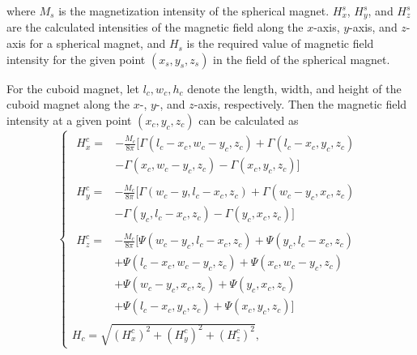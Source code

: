 \documentclass[journal]{IEEEtran}
\begin{document}
where $M_s$ is the magnetization intensity of the spherical magnet. 
$H_x^s$, $H_y^s$, and $H_z^s$ are the calculated intensities of the magnetic field along the $x$-axis, $y$-axis, and $z$-axis for a spherical magnet, and $H_s$ is the required value of magnetic field intensity for the given point $(x_s, y_s, z_s)$ in the field of the spherical magnet.



For the cuboid magnet, let $l_c, w_c, h_c$ denote the length, width, and height of the cuboid magnet along the $x$-, $y$-, and $z$-axis, respectively. Then the magnetic field intensity at a given point $(x_c, y_c, z_c)$ can be calculated as
\begin{equation}
\label{mag-cuboid}
    \left\{\begin{array}{lr}
    \begin{aligned}
    H_{x}^{c} = &-\frac{M_c}{8\pi}[\Gamma(l_c - x_c, w_c - y_c, z_c)+\Gamma(l_c - x_c, y_c, z_c) \\
       &-\Gamma(x_c, w_c - y_c, z_c)-\Gamma(x_c, y_c, z_c)]
    \end{aligned}
    \\
    \begin{aligned}
    H_{y}^{c} = &-\frac{M_c}{8\pi}[\Gamma(w_c - y, l_c - x_c, z_c)+\Gamma(w_c - y_c, x_c, z_c) \\            &-\Gamma(y_c, l_c - x_c, z_c)-\Gamma(y_c, x_c, z_c)]
    \end{aligned}
    \\
    \begin{aligned}
    H_{z}^{c} = &-\frac{M_c}{8\pi}[\Psi(w_c - y_c, l_c - x_c, z_c) + \Psi(y_c, l_c - x_c, z_c) \\                &+\Psi(l_c - x_c, w_c - y_c, z_c) + \Psi(x_c, w_c - y_c, z_c) \\ 
                  &+\Psi(w_c - y_c, x_c, z_c) + \Psi(y_c, x_c, z_c) \\ &+\Psi(l_c - x_c, y_c, z_c)+\Psi(x_c, y_c, z_c)]
    \end{aligned}
    \\
    H_{c} = \sqrt{(H_{x}^{c})^2+(H_{y}^{c})^2+(H_{z}^{c})^2},
    \end{array}\right.
\end{equation}
\end{document}
